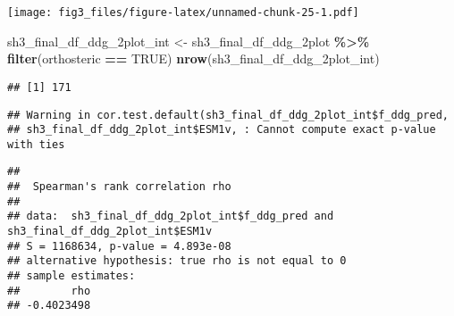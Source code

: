 \documentclass[
]{article}
\newenvironment{Shaded}{\begin{snugshade}}{\end{snugshade}}
\newcommand{\AttributeTok}[1]{\textcolor[rgb]{0.13,0.29,0.53}{#1}}
\newcommand{\CommentTok}[1]{\textcolor[rgb]{0.56,0.35,0.01}{\textit{#1}}}
\newcommand{\ConstantTok}[1]{\textcolor[rgb]{0.56,0.35,0.01}{#1}}
\newcommand{\FunctionTok}[1]{\textcolor[rgb]{0.13,0.29,0.53}{\textbf{#1}}}
\newcommand{\NormalTok}[1]{#1}
\newcommand{\OtherTok}[1]{\textcolor[rgb]{0.56,0.35,0.01}{#1}}
\newcommand{\SpecialCharTok}[1]{\textcolor[rgb]{0.81,0.36,0.00}{\textbf{#1}}}
\newcommand{\StringTok}[1]{\textcolor[rgb]{0.31,0.60,0.02}{#1}}
\begin{document}
\texttt{[image: fig3\_files/figure-latex/unnamed-chunk-25-1.pdf]}

\begin{Shaded}
\begin{Highlighting}[]
\NormalTok{sh3\_final\_df\_ddg\_2plot\_int }\OtherTok{\textless{}{-}}\NormalTok{ sh3\_final\_df\_ddg\_2plot }\SpecialCharTok{\%\textgreater{}\%} \FunctionTok{filter}\NormalTok{(orthosteric }\SpecialCharTok{==} \ConstantTok{TRUE}\NormalTok{)}
\FunctionTok{nrow}\NormalTok{(sh3\_final\_df\_ddg\_2plot\_int)}
\end{Highlighting}
\end{Shaded}

\begin{verbatim}
## [1] 171
\end{verbatim}

\begin{Shaded}
\end{Shaded}

\begin{verbatim}
## Warning in cor.test.default(sh3_final_df_ddg_2plot_int$f_ddg_pred,
## sh3_final_df_ddg_2plot_int$ESM1v, : Cannot compute exact p-value with ties
\end{verbatim}

\begin{verbatim}
## 
##  Spearman's rank correlation rho
## 
## data:  sh3_final_df_ddg_2plot_int$f_ddg_pred and sh3_final_df_ddg_2plot_int$ESM1v
## S = 1168634, p-value = 4.893e-08
## alternative hypothesis: true rho is not equal to 0
## sample estimates:
##        rho 
## -0.4023498
\end{verbatim}
\end{document}
